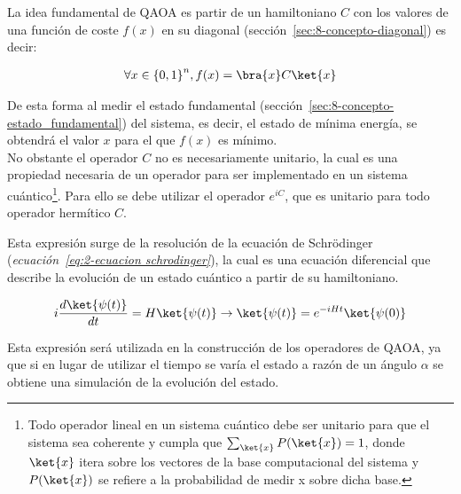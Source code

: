 La idea fundamental de QAOA es partir de un hamiltoniano $C$ con los valores de una función de coste $f(x)$ en su diagonal (sección~\ref{sec:8-concepto-diagonal}) es decir:

\begin{align}
  \forall{x \in {\{0, 1\}}^{n}}, f(x) = \bra{x}C\ket{x}
\end{align}

De esta forma al medir el estado fundamental (sección~\ref{sec:8-concepto-estado_fundamental}) del sistema, es decir, el estado de mínima energía, se obtendrá el valor $x$ para el que $f(x)$ es mínimo.
\\
No obstante el operador $C$ no es necesariamente unitario, la cual es una propiedad necesaria de un operador para ser implementado en un sistema cuántico\footnote{
  Todo operador lineal en un sistema cuántico debe ser unitario para que el sistema sea coherente y cumpla que $\sum_{\ket{x}} {P(\ket{x})} = 1$,
  donde $\ket{x}$ itera sobre los vectores de la base computacional del sistema y \(P(\ket{x})\) se refiere a la probabilidad de medir x sobre dicha base.}.
Para ello se debe utilizar el operador $e^{iC}$, que es unitario para todo operador hermítico $C$.

Esta expresión surge de la resolución de la ecuación de Schrödinger (\textit{ecuación~\ref{eq:2-ecuacion schrodinger}}), la cual es una ecuación diferencial que describe la evolución de un estado cuántico a partir de su hamiltoniano.

\begin{align}\label{eq:2-ecuacion schrodinger}
  i \frac{d\ket{\psi(t)}}{dt} = H \ket{\psi(t)} \rightarrow \ket{\psi(t)} = e^{-i H t}\ket{\psi(0)}
\end{align}

Esta expresión será utilizada en la construcción de los operadores de QAOA, ya que si en lugar de utilizar el tiempo se varía el estado a razón de un ángulo $\alpha$ se obtiene una simulación de la evolución del estado.

